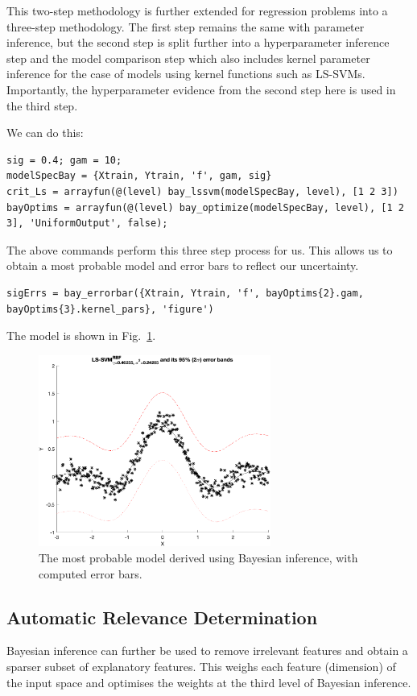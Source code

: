 \documentclass[10pt,a4paper]{article}
\begin{document}
This two-step methodology is further extended for regression problems into a three-step methodology. The first step remains the same with parameter inference, but the second step is split further into a hyperparameter inference step and the model comparison step which also includes kernel parameter inference for the case of models using kernel functions such as LS-SVMs. Importantly, the hyperparameter evidence from the second step here is used in the third step. 

We can do this:

\begin{lstlisting}[style=Matlab-editor]
sig = 0.4; gam = 10;
modelSpecBay = {Xtrain, Ytrain, 'f', gam, sig}
crit_Ls = arrayfun(@(level) bay_lssvm(modelSpecBay, level), [1 2 3])
bayOptims = arrayfun(@(level) bay_optimize(modelSpecBay, level), [1 2 3], 'UniformOutput', false);
\end{lstlisting}

The above commands perform this three step process for us. This allows us to obtain a most probable model and error bars to reflect our uncertainty.

\begin{lstlisting}[style=Matlab-editor]
sigErrs = bay_errorbar({Xtrain, Ytrain, 'f', bayOptims{2}.gam, bayOptims{3}.kernel_pars}, 'figure')
\end{lstlisting}

The model is shown in Fig.~\ref{fig:bayesianErrorbars}.

\begin{figure}[h!]
  \includegraphics[width=3in]{bayesianErrorbars.png}
  \caption{The most probable model derived using Bayesian inference, with computed error bars.}
  \label{fig:bayesianErrorbars}
\end{figure}

\subsection{Automatic Relevance Determination}
Bayesian inference can further be used to remove irrelevant features and obtain a sparser subset of explanatory features. This weighs each feature (dimension) of the input space and optimises the weights at the third level of Bayesian inference.
\end{document}
